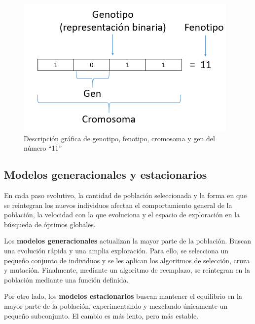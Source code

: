 \begin{figure}[H]
	\centering
	\includegraphics[width=0.75\linewidth]{img/fen_gen.png}
	\caption{Descripción gráfica de genotipo, fenotipo, cromosoma y gen del número ``11''}
	\label{fig:fen_gen}
\end{figure}

\subsection{Modelos generacionales y estacionarios}

En cada paso evolutivo, la cantidad de población seleccionada y la forma en que se reintegran los nuevos individuos afectan el comportamiento general de la población, la velocidad con la que evoluciona y el espacio de exploración en la búsqueda de óptimos globales.

Los \textbf{modelos generacionales} actualizan la mayor parte de la población. Buscan una evolución rápida y una amplia exploración. Para ello, se selecciona un pequeño conjunto de individuos y se les aplican los algoritmos de selección, cruza y mutación. Finalmente, mediante un algoritmo de reemplazo, se reintegran en la población mediante una función definida.

Por otro lado, los \textbf{modelos estacionarios} buscan mantener el equilibrio en la mayor parte de la población, experimentando y mezclando únicamente un pequeño subconjunto. El cambio es más lento, pero más estable.
